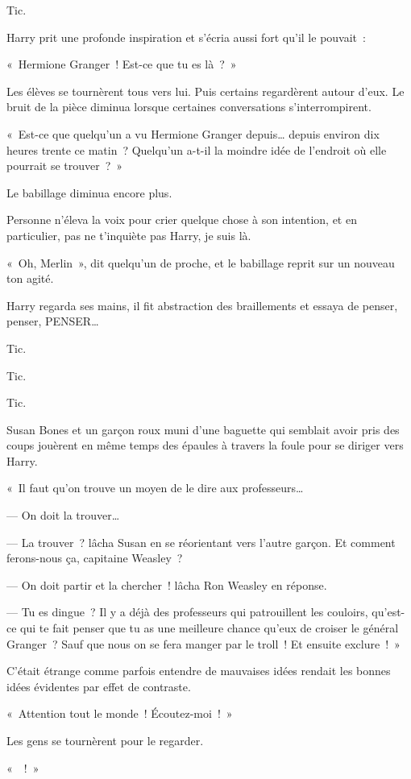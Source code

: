 Tic.

Harry prit une profonde inspiration et s'écria aussi fort qu'il le pouvait~:

«~Hermione Granger~! Est-ce que tu es là~?~»

Les élèves se tournèrent tous vers lui. Puis certains regardèrent autour d'eux. Le bruit de la pièce diminua lorsque certaines conversations s'interrompirent.

«~Est-ce que quelqu'un a vu Hermione Granger depuis… depuis environ dix heures trente ce matin~? Quelqu'un a-t-il la moindre idée de l'endroit où elle pourrait se trouver~?~»

Le babillage diminua encore plus.

Personne n'éleva la voix pour crier quelque chose à son intention, et en particulier, pas ne t'inquiète pas Harry, je suis là.

«~Oh, Merlin~», dit quelqu'un de proche, et le babillage reprit sur un nouveau ton agité.

Harry regarda ses mains, il fit abstraction des braillements et essaya de penser, penser, PENSER…

Tic.

Tic.

Tic.

Susan Bones et un garçon roux muni d'une baguette qui semblait avoir pris des coups jouèrent en même temps des épaules à travers la foule pour se diriger vers Harry.

«~Il faut qu'on trouve un moyen de le dire aux professeurs…

--- On doit la trouver…

--- La trouver~? lâcha Susan en se réorientant vers l'autre garçon. Et comment ferons-nous ça, capitaine Weasley~?

--- On doit partir et la chercher~! lâcha Ron Weasley en réponse.

--- Tu es dingue~? Il y a déjà des professeurs qui patrouillent les couloirs, qu'est-ce qui te fait penser que tu as une meilleure chance qu'eux de croiser le général Granger~? Sauf que nous on se fera manger par le troll~! Et ensuite exclure~!~»

C'était étrange comme parfois entendre de mauvaises idées rendait les bonnes idées évidentes par effet de contraste.

«~Attention tout le monde~! Écoutez-moi~!~»

Les gens se tournèrent pour le regarder.

«~~!~»

